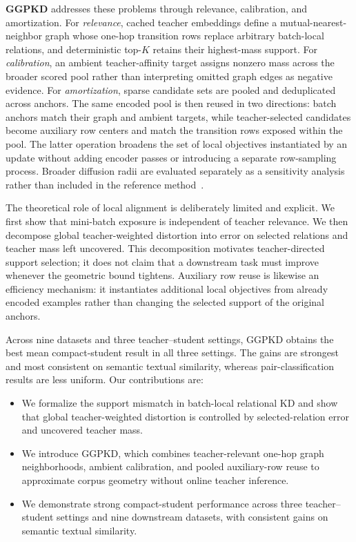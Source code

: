 \textbf{GGPKD} addresses these problems through relevance, calibration, and amortization. For \emph{relevance}, cached teacher embeddings define a mutual-nearest-neighbor graph whose one-hop transition rows replace arbitrary batch-local relations, and deterministic top-$K$ retains their highest-mass support. For \emph{calibration}, an ambient teacher-affinity target assigns nonzero mass across the broader scored pool rather than interpreting omitted graph edges as negative evidence. For \emph{amortization}, sparse candidate sets are pooled and deduplicated across anchors. The same encoded pool is then reused in two directions: batch anchors match their graph and ambient targets, while teacher-selected candidates become auxiliary row centers and match the transition rows exposed within the pool. The latter operation broadens the set of local objectives instantiated by an update without adding encoder passes or introducing a separate row-sampling process. Broader diffusion radii are evaluated separately as a sensitivity analysis rather than included in the reference method~\citep{coifman2006diffusionmaps}.

The theoretical role of local alignment is deliberately limited and explicit. We first show that mini-batch exposure is independent of teacher relevance. We then decompose global teacher-weighted distortion into error on selected relations and teacher mass left uncovered. This decomposition motivates teacher-directed support selection; it does not claim that a downstream task must improve whenever the geometric bound tightens. Auxiliary row reuse is likewise an efficiency mechanism: it instantiates additional local objectives from already encoded examples rather than changing the selected support of the original anchors.

Across nine datasets and three teacher--student settings, GGPKD obtains the best mean compact-student result in all three settings. The gains are strongest and most consistent on semantic textual similarity, whereas pair-classification results are less uniform. Our contributions are:
\begin{itemize}
    \item We formalize the support mismatch in batch-local relational KD and show that global teacher-weighted distortion is controlled by selected-relation error and uncovered teacher mass.
    \item We introduce GGPKD, which combines teacher-relevant one-hop graph neighborhoods, ambient calibration, and pooled auxiliary-row reuse to approximate corpus geometry without online teacher inference.
    \item We demonstrate strong compact-student performance across three teacher--student settings and nine downstream datasets, with consistent gains on semantic textual similarity.
\end{itemize}

